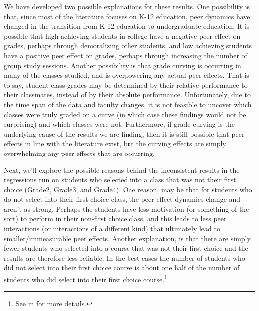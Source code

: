 We have developed two possible explanations for these results. 
One possibility is that, since most of the literature focuses on K-12 education, peer dynamics have changed in the transition from K-12 education to undergraduate education. 
It is possible that high achieving students in college have a negative peer effect on grades, perhaps through demoralizing other students, and low achieving students have a positive peer effect on grades, perhaps through increasing the number of group study sessions. 
Another possibility is that grade curving is occurring in many of the classes studied, and is overpowering any actual peer effects. 
That is to say, student class grades may be determined by their relative performance to their classmates, instead of by their absolute performance. 
Unfortunately, due to the time span of the data and faculty changes, it is not feasible to uncover which classes were truly graded on a curve (in which case these findings would not be surprising) and which classes were not. 
Furthermore, if grade curving is the underlying cause of the results we are finding, then it is still possible that peer effects in line with the literature exist, but the curving effects are simply overwhelming any peer effects that are occurring. 

Next, we'll explore the possible reasons behind the inconsistent results in the regressions run on students who selected into a class that was not their first choice (Grade2, Grade3, and Grade4). 
One reason, may be that for students who do not select into their first choice class, the peer effect dynamics change and aren't as strong. 
Perhaps the students have less motivation (or something of the sort) to perform in their non-first choice class, and this leads to less peer interactions (or interactions of a different kind) that ultimately lead to smaller/immeasurable peer effects. 
Another explanation, is that there are simply fewer students who selected into a course that was not their first choice and the results are therefore less reliable. 
In the best cases the number of students who did not select into their first choice course is about one half of the number of students who did select into their first choice course.\footnote{See  in  for more details.} 

